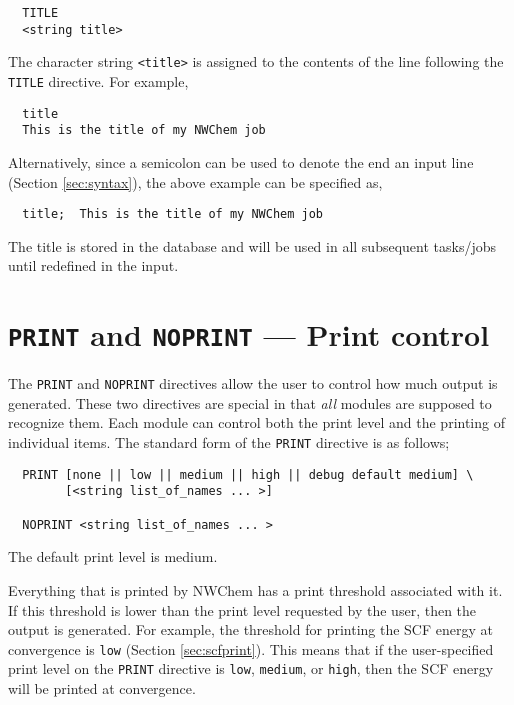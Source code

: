 \begin{verbatim}
  TITLE 
  <string title>
\end{verbatim}

The character string \verb+<title>+ is assigned to the contents of the
line following the \verb+TITLE+ directive.  For example,

\begin{verbatim}
  title
  This is the title of my NWChem job
\end{verbatim}

Alternatively, since a semicolon can be used to denote the end an input line
(Section \ref{sec:syntax}), the above example can be specified as,

\begin{verbatim}
  title;  This is the title of my NWChem job
\end{verbatim}

The title is stored in the database and will be used in all subsequent
tasks/jobs until redefined in the input.

\section{{\tt PRINT} and {\tt NOPRINT} --- Print control}
\label{sec:printcontrol}

The \verb+PRINT+ and \verb+NOPRINT+ directives allow the user to
control how much output is generated.  These two directives are
special in that {\em all} modules are supposed to recognize
them. Each module can control both the print
level and the printing of individual items.  The standard form of the
\verb+PRINT+ directive is as follows;

\begin{verbatim}
  PRINT [none || low || medium || high || debug default medium] \
        [<string list_of_names ... >]

  NOPRINT <string list_of_names ... >
\end{verbatim}
The default print level is medium.

Everything that is printed by NWChem has a print threshold associated
with it. If this threshold is lower than the print level requested by
the user, then the output is generated.  For example, the threshold
for printing the SCF energy at convergence is \verb+low+ (Section
\ref{sec:scfprint}).  This means that if the user-specified print level 
on the \verb+PRINT+ directive is
\verb+low+, \verb+medium+, or \verb+high+, then the
SCF energy will be printed at convergence.

